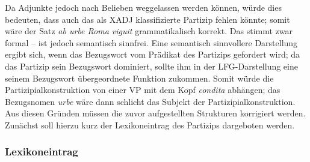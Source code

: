 \documentclass[12pt,a4paper]{article}
\begin{document}
Da Adjunkte jedoch nach Belieben weggelassen werden können, würde dies bedeuten, dass auch das als XADJ klassifizierte Partizip fehlen könnte; somit wäre der Satz \textit{ab urbe Roma viguit} grammatikalisch korrekt. Das stimmt zwar formal -- ist jedoch semantisch sinnfrei. Eine semantisch sinnvollere Darstellung ergibt sich, wenn das Bezugswort vom Prädikat des Partizips gefordert wird; da das Partizip sein Bezugswort dominiert, sollte ihm in der LFG-Darstellung eine seinem Bezugswort übergeordnete Funktion zukommen. Somit würde die Partizipialkonstruktion von einer VP mit dem Kopf \textit{condita} abhängen; das Bezugsnomen \textit{urbe} wäre dann schlicht das Subjekt der Partizipialkonstruktion.
Aus diesen Gründen müssen die zuvor aufgestellten Strukturen korrigiert werden. Zunächst soll hierzu kurz der Lexikoneintrag des Partizips dargeboten werden.

\subsubsection{Lexikoneintrag}
\end{document}
